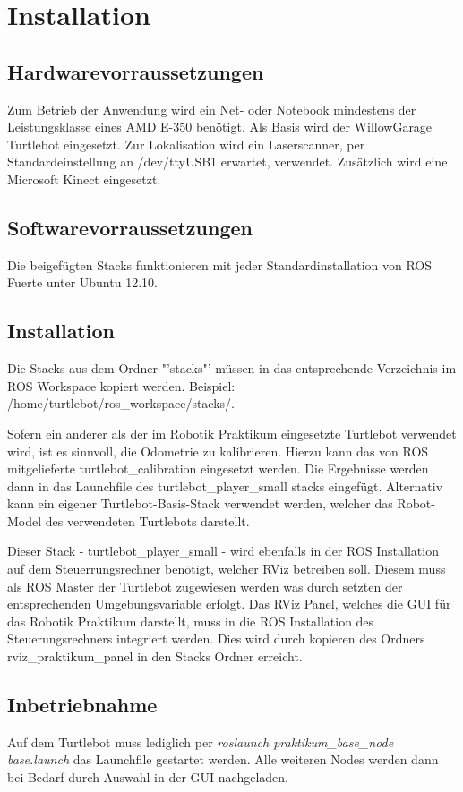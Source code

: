 \chapter{Installation}
\section{Hardwarevorraussetzungen}
Zum Betrieb der Anwendung wird ein Net- oder Notebook mindestens der Leistungsklasse eines AMD E-350 benötigt. Als Basis wird der WillowGarage Turtlebot eingesetzt. Zur Lokalisation wird ein Laserscanner, per Standardeinstellung an /dev/ttyUSB1 erwartet, verwendet. Zusätzlich wird eine Microsoft Kinect eingesetzt.

\section{Softwarevorraussetzungen}
Die beigefügten Stacks funktionieren mit jeder Standardinstallation von ROS Fuerte unter Ubuntu 12.10.

\section{Installation}
Die Stacks aus dem Ordner  "'stacks"'  müssen in das entsprechende Verzeichnis im ROS Workspace kopiert werden. Beispiel: /home/turtlebot/ros\_workspace/stacks/.

Sofern ein anderer als der im Robotik Praktikum eingesetzte Turtlebot verwendet wird, ist es sinnvoll, die Odometrie zu kalibrieren. Hierzu kann das von ROS mitgelieferte turtlebot\_calibration eingesetzt werden. Die Ergebnisse werden dann in das Launchfile des turtlebot\_player\_small stacks eingefügt. Alternativ kann ein eigener Turtlebot-Basis-Stack verwendet werden, welcher das Robot-Model des verwendeten Turtlebots darstellt.

Dieser Stack - turtlebot\_player\_small - wird ebenfalls in der ROS Installation auf dem Steuerrungsrechner benötigt, welcher RViz betreiben soll. Diesem muss als ROS Master der Turtlebot zugewiesen werden was durch setzten der entsprechenden Umgebungsvariable erfolgt. Das RViz Panel, welches die GUI für das Robotik Praktikum darstellt, muss in die ROS Installation des Steuerungsrechners integriert werden. Dies wird durch kopieren des Ordners rviz\_praktikum\_panel in den Stacks Ordner erreicht.

\section{Inbetriebnahme}
Auf dem Turtlebot muss lediglich per \emph{roslaunch praktikum\_base\_node base.launch} das Launchfile gestartet werden. Alle weiteren Nodes werden dann bei Bedarf durch Auswahl in der GUI nachgeladen.

